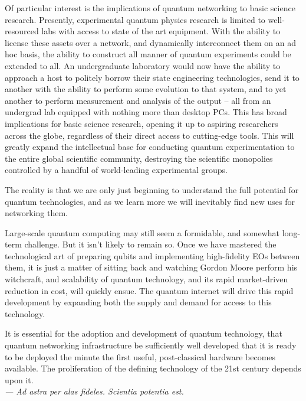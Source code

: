 Of particular interest is the implications of quantum networking to basic science research. Presently, experimental quantum physics research is limited to well-resourced labs with access to state of the art equipment. With the ability to license these assets over a network, and dynamically interconnect them on an ad hoc basis, the ability to construct all manner of quantum experiments could be extended to all. An undergraduate laboratory would now have the ability to approach a host to politely borrow their state engineering technologies, send it to another with the ability to perform some evolution to that system, and to yet another to perform measurement and analysis of the output -- all from an undergrad lab equipped with nothing more than desktop PCs. This has broad implications for basic science research, opening it up to aspiring researchers across the globe, regardless of their direct access to cutting-edge tools. This will greatly expand the intellectual base for conducting quantum experimentation to the entire global scientific community, destroying the scientific monopolies controlled by a handful of world-leading experimental groups.

The reality is that we are only just beginning to understand the full potential for quantum technologies, and as we learn more we will inevitably find new uses for networking them.

Large-scale quantum computing may still seem a formidable, and somewhat long-term challenge. But it isn't likely to remain so. Once we have mastered the technological art of preparing qubits and implementing high-fidelity EOs between them, it is just a matter of sitting back and watching Gordon Moore perform his witchcraft, and scalability of quantum technology, and its rapid market-driven reduction in cost, will quickly ensue. The quantum internet will drive this rapid development by expanding both the supply and demand for access to this technology.

It is essential for the adoption and development of quantum technology, that quantum networking infrastructure be sufficiently well developed that it is ready to be deployed the minute the first useful, post-classical hardware becomes available. The proliferation of the defining technology of the 21st century depends upon it.
\\

\textit{--- Ad astra per alas fideles. Scientia potentia est.}